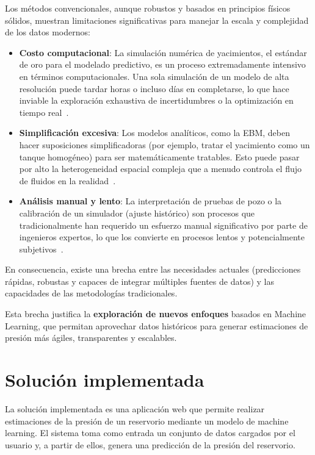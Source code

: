 \documentclass[12pt,a4paper]{article}
\begin{document}
Los métodos convencionales, aunque robustos y basados en principios físicos sólidos, muestran limitaciones
significativas para manejar la escala y complejidad de los datos modernos:

\begin{itemize}
  \item \textbf{Costo computacional}: La simulación numérica de yacimientos, el estándar de oro para el
  modelado predictivo, es un proceso extremadamente intensivo en términos computacionales. Una sola
  simulación de un modelo de alta resolución puede tardar horas o incluso días en completarse, lo que hace
  inviable la exploración exhaustiva de incertidumbres o la optimización en tiempo real~\cite{ref2}.
  \item \textbf{Simplificación excesiva}: Los modelos analíticos, como la EBM, deben hacer suposiciones
  simplificadoras (por ejemplo, tratar el yacimiento como un tanque homogéneo) para ser matemáticamente
  tratables. Esto puede pasar por alto la heterogeneidad espacial compleja que a menudo controla el flujo
  de fluidos en la realidad~\cite{ref3}.
  \item \textbf{Análisis manual y lento}: La interpretación de pruebas de pozo o la calibración de un
  simulador (ajuste histórico) son procesos que tradicionalmente han requerido un esfuerzo manual
  significativo por parte de ingenieros expertos, lo que los convierte en procesos lentos y potencialmente
  subjetivos~\cite{ref4}.
\end{itemize}

En consecuencia, existe una brecha entre las necesidades actuales (predicciones rápidas, robustas y
capaces de integrar múltiples fuentes de datos) y las capacidades de las metodologías tradicionales.

Esta brecha justifica la \textbf{exploración de nuevos enfoques} basados en Machine Learning, que permitan
aprovechar datos históricos para generar estimaciones de presión más ágiles, transparentes y escalables.


\newpage
\section{Solución implementada}

La solución implementada es una aplicación web que permite realizar estimaciones de la presión de un reservorio mediante un modelo
de machine learning. El sistema toma como entrada un conjunto de datos cargados por el usuario y, a partir
de ellos, genera una predicción de la presión del reservorio.
\end{document}
